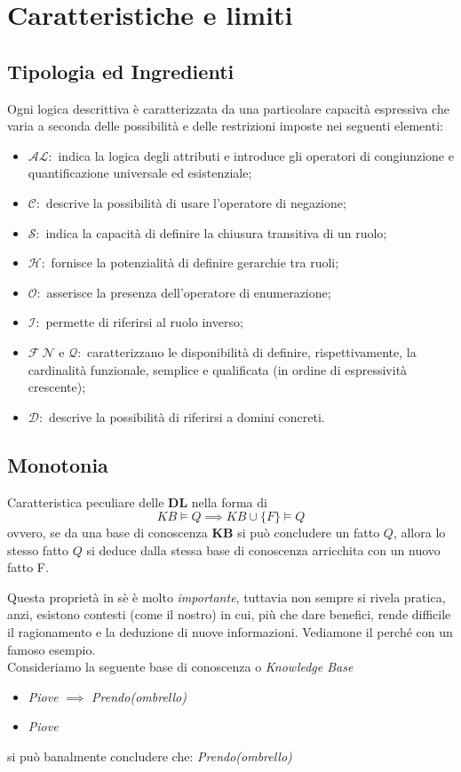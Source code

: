 \section{Caratteristiche e limiti}
\subsection{Tipologia ed Ingredienti}
Ogni logica descrittiva è caratterizzata da una particolare capacità espressiva che
varia a seconda delle possibilità e delle restrizioni imposte nei seguenti elementi:
\begin{itemize}
	\item $\mathcal{AL:}$ indica la logica degli attributi e introduce gli operatori 
	di congiunzione e quantificazione universale ed esistenziale;
	\item $\mathcal{C:}$ descrive la possibilità di usare l’operatore di negazione;
	\item $\mathcal{S:}$ indica la capacità di definire la chiusura transitiva di un ruolo;
	\item $\mathcal{H:}$ fornisce la potenzialità di definire gerarchie tra ruoli;
	\item $\mathcal{O:}$ asserisce la presenza dell'operatore di enumerazione;
	\item $\mathcal{I:}$ permette di riferirsi al ruolo inverso;
	\item $\mathcal{F}\ \mathcal{N}\text{ e }\mathcal{Q:}$ caratterizzano le disponibilità 
	di definire, rispettivamente, la cardinalità funzionale, semplice e qualificata (in ordine di espressività crescente);
	\item $\mathcal{D:}$ descrive la possibilità di riferirsi a domini concreti.
\end{itemize}
\subsection{Monotonia}\label{monoto}
Caratteristica peculiare delle \textbf{DL} nella forma di
\[ KB \models Q \implies KB \cup \{F\} \models Q\]
ovvero, se da una base di conoscenza \textbf{KB} si può concludere un fatto $ Q $, 
allora lo stesso fatto $ Q $ si deduce dalla stessa base di conoscenza arricchita con un nuovo fatto F.

Questa proprietà in sè è molto \textit{importante}, tuttavia non sempre si rivela pratica, anzi, 
esistono contesti (come il nostro) in cui, più che dare benefici, rende difficile il 
ragionamento e la deduzione di nuove informazioni.
Vediamone il perché con un famoso esempio.\\
Consideriamo la seguente base di conoscenza o \textit{Knowledge Base}      
\begin{itemize}
	\item[] \textit{Piove} $\implies$ \textit{Prendo(ombrello)}
	\item[] \textit{Piove}
\end{itemize}
si può banalmente concludere che: \textit{Prendo(ombrello)}

